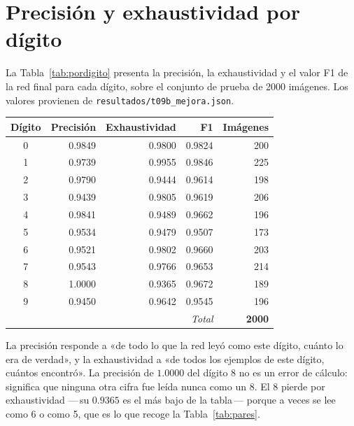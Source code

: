 \documentclass[12pt,letterpaper]{article}
\begin{document}
\clearpage
\section{Precisión y exhaustividad por dígito}
\label{ap:pordigito}

La Tabla~\ref{tab:pordigito} presenta la precisión, la exhaustividad y el valor F1 de
la red final para cada dígito, sobre el conjunto de prueba de 2000 imágenes. Los
valores provienen de \texttt{resultados/t09b\_mejora.json}.

\begin{center}
\label{tab:pordigito}
\begin{tabular}{crrrr}
\toprule
\textbf{Dígito} & \textbf{Precisión} & \textbf{Exhaustividad} & \textbf{F1} & \textbf{Imágenes} \\
\midrule
0 & 0.9849 & 0.9800 & 0.9824 & 200 \\
1 & 0.9739 & 0.9955 & 0.9846 & 225 \\
2 & 0.9790 & 0.9444 & 0.9614 & 198 \\
3 & 0.9439 & 0.9805 & 0.9619 & 206 \\
4 & 0.9841 & 0.9489 & 0.9662 & 196 \\
5 & 0.9534 & 0.9479 & 0.9507 & 173 \\
6 & 0.9521 & 0.9802 & 0.9660 & 203 \\
7 & 0.9543 & 0.9766 & 0.9653 & 214 \\
8 & 1.0000 & 0.9365 & 0.9672 & 189 \\
9 & 0.9450 & 0.9642 & 0.9545 & 196 \\
\midrule
\multicolumn{4}{r}{\textit{Total}} & \textbf{2000} \\
\bottomrule
\end{tabular}
\end{center}

\noindent La precisión responde a «de todo lo que la red leyó como este dígito, cuánto lo era
de verdad», y la exhaustividad a «de todos los ejemplos de este dígito, cuántos
encontró». La precisión de $1.0000$ del dígito 8 no es un error de cálculo: significa
que ninguna otra cifra fue leída nunca como un 8. El 8 pierde por exhaustividad
---\,su $0.9365$ es el más bajo de la tabla\,--- porque a veces se lee como 6 o como 5,
que es lo que recoge la Tabla~\ref{tab:pares}.
\end{document}
